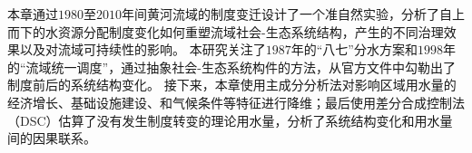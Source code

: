 

本章通过$1980$至$2010$年间黄河流域的制度变迁设计了一个准自然实验，分析了自上而下的水资源分配制度变化如何重塑流域社会-生态系统结构，产生的不同治理效果以及对流域可持续性的影响。
本研究关注了$1987$年的“八七”分水方案和$1998$年的“流域统一调度”，通过抽象社会-生态系统构件的方法，从官方文件中勾勒出了制度前后的系统结构变化。
接下来，本章使用主成分分析法对影响区域用水量的经济增长、基础设施建设、和气候条件等特征进行降维；最后使用差分合成控制法（DSC）\cite{arkhangelsky2021}估算了没有发生制度转变的理论用水量，分析了系统结构变化和用水量间的因果联系。
